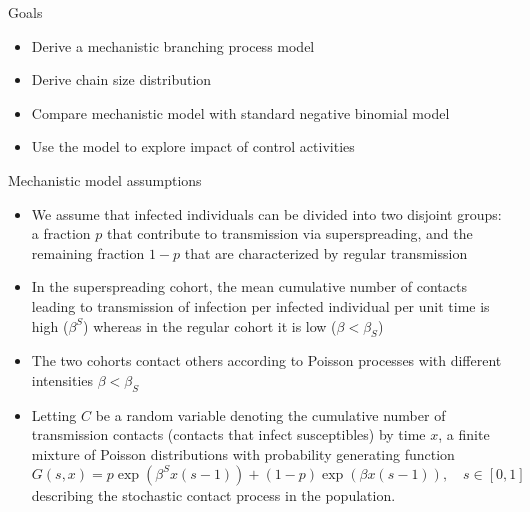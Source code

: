 \documentclass[
  ignorenonframetext,
]{beamer}
\providecommand{\tightlist}{%
  \setlength{\itemsep}{0pt}\setlength{\parskip}{0pt}}
\begin{document}
\begin{frame}{Goals}
\protect\hypertarget{goals}{}
\begin{itemize}
\tightlist
\item
  Derive a mechanistic branching process model
\item
  Derive chain size distribution
\item
  Compare mechanistic model with standard negative binomial model
\item
  Use the model to explore impact of control activities
\end{itemize}
\end{frame}

\begin{frame}{Mechanistic model assumptions}
\protect\hypertarget{mechanistic-model-assumptions}{}
\begin{itemize}
\tightlist
\item
  We assume that infected individuals can be divided into two disjoint
  groups: a fraction \(p\) that contribute to transmission via
  superspreading, and the remaining fraction \(1-p\) that are
  characterized by regular transmission
\item
  In the superspreading cohort, the mean cumulative number of contacts
  leading to transmission of infection per infected individual per unit
  time is high (\(\beta^S\)) whereas in the regular cohort it is low
  (\(\beta < \beta_S\))
\item
  The two cohorts contact others according to Poisson processes with
  different intensities \(\beta < \beta_S\)
\item
  Letting \(C\) be a random variable denoting the cumulative number of
  transmission contacts (contacts that infect susceptibles) by time
  \(x\), a finite mixture of Poisson distributions with probability
  generating function \begin{equation*}\label{eqn:contactpgf}
    G(s,x) = p \exp \left ( \beta^S x (s-1) \right)  + (1-p) \exp  \left (\beta x (s-1)\right), \quad s \in [0,1]
  \end{equation*} describing the stochastic contact process in the
  population.
\end{itemize}
\end{frame}
\end{document}

